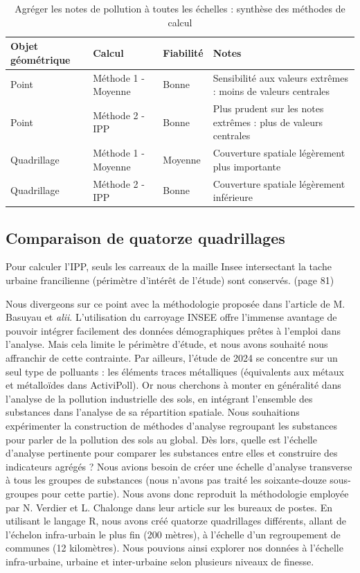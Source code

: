 \documentclass[a4paper,twoside,12pt]{book}
\begin{document}
\begin{table}[h]
\centering
\small
\caption{Agréger les notes de pollution à toutes les échelles : synthèse des méthodes de calcul}
\begin{tabular}{>{\raggedright}p{3.5cm}p{3.5cm}p{2cm}p{3.5cm}}
    \toprule
    Objet géométrique & Calcul & Fiabilité & Notes \\
    \midrule
    Point & Méthode 1 - Moyenne & Bonne & Sensibilité aux valeurs extrêmes : moins de valeurs centrales\\
    Point & Méthode 2 - IPP & Bonne & Plus prudent sur les notes extrêmes : plus de valeurs centrales \\
    Quadrillage & Méthode 1 - Moyenne & Moyenne & Couverture spatiale légèrement plus importante \\
    Quadrillage & Méthode 2 - IPP & Bonne & Couverture spatiale légèrement inférieure \\
    \bottomrule
\end{tabular}
\end{table}


\subsection{Comparaison de quatorze quadrillages}

\og{} Pour calculer l’IPP, seuls les carreaux de la maille Insee intersectant la tache urbaine francilienne (périmètre d’intérêt de l’étude) sont conservés. (page 81)\fg{}

Nous divergeons sur ce point avec la méthodologie proposée dans l'article de M. Basuyau et \textit{alii}. L'utilisation du carroyage INSEE offre l'immense avantage de pouvoir intégrer facilement des données démographiques prêtes à l'emploi dans l'analyse. Mais cela limite le périmètre d'étude, et nous avons souhaité nous affranchir de cette contrainte. Par ailleurs, l'étude de 2024 se concentre sur un seul type de polluants : les éléments traces métalliques (équivalents aux métaux et métalloïdes dans ActiviPoll). Or nous cherchons à monter en généralité dans l'analyse de la pollution industrielle des sols, en intégrant l'ensemble des substances dans l'analyse de sa répartition spatiale. Nous souhaitions expérimenter la construction de méthodes d'analyse regroupant les substances pour parler de la pollution des sols au global. Dès lors, quelle est l'échelle d'analyse pertinente pour comparer les substances entre elles et construire des indicateurs agrégés ? Nous avions besoin de créer une échelle d'analyse transverse à tous les groupes de substances (nous n'avons pas traité les soixante-douze sous-groupes pour cette partie). Nous avons donc reproduit la méthodologie employée par N. Verdier et L. Chalonge dans leur article sur les bureaux de postes. En utilisant le langage R, nous avons créé quatorze quadrillages différents, allant de l'échelon infra-urbain le plus fin (200 mètres), à l'échelle d'un regroupement de communes (12 kilomètres).  Nous pouvions ainsi explorer nos données à l'échelle infra-urbaine, urbaine et inter-urbaine selon plusieurs niveaux de finesse. 
\end{document}
